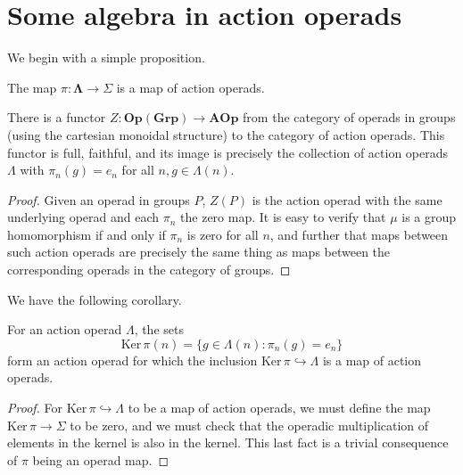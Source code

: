 \documentclass{amsbook} %
\newcommand{\mb}{\mathbf}
\newcommand{\ML}{\mathbf{\Lambda}}
\numberwithin{section}{chapter}
\begin{document}
\section{Some algebra in action operads}

We begin with a simple proposition.

\begin{prop}
The map $\pi:\ML \to \Sigma$ is a map of action operads.
\end{prop}


\begin{prop}\label{Z}
There is a functor $Z: \mb{Op}(\mb{Grp}) \to \mb{AOp}$ from the category of operads in groups (using the cartesian monoidal structure) to the category of action operads.  This functor is full, faithful, and its image is precisely the collection of action operads $\Lambda$ with $\pi_{n}(g) = e_{n}$ for all $n, g \in \Lambda(n)$.
\end{prop}
\begin{proof}
Given an operad in groups $P$, $Z(P)$ is the action operad with the same underlying operad and each $\pi_{n}$ the zero map.  It is easy to verify that $\mu$ is a group homomorphism if and only if $\pi_{n}$ is zero for all $n$, and further that maps between such action operads are precisely the same thing as maps between the corresponding operads in the category of groups.
\end{proof}

We have the following corollary.
\begin{cor}\label{corZ}
For an action operad $\Lambda$, the sets
\[
\textrm{Ker}\,\pi(n) = \{g \in \Lambda(n) : \pi_{n}(g) = e_{n} \}
\]
form an action operad for which the inclusion $\textrm{Ker}\,\pi \hookrightarrow \Lambda$ is a map of action operads.
\end{cor}
\begin{proof}
For $\textrm{Ker}\,\pi \hookrightarrow \Lambda$ to be a map of action operads, we must define the map $\textrm{Ker}\,\pi \rightarrow \Sigma$ to be zero,  and we must check that the operadic multiplication of elements in the kernel is also in the kernel.  This last fact is a trivial consequence of $\pi$ being an operad map.
\end{proof}

\end{document}
